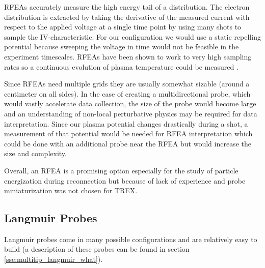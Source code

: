
RFEAs accurately measure the high energy tail of a distribution. The electron distribution is extracted by taking the derivative of the measured current with respect to the applied voltage at a single time point by using many shots to sample the IV-characteristic. For our configuration we would use a static repelling potential because sweeping the voltage in time would not be feasible in the experiment timescales. RFEAs have been shown to work to very high sampling rates so a continuous evolution of plasma temperature could be measured \cite{Hu_Rovey_Zhao_2017}.


Since RFEAs need multiple grids they are usually somewhat sizable (around a centimeter on all sides). In the case of creating a multidirectional probe, which would vastly accelerate data collection, the size of the probe would become large and an understanding of non-local perturbative physics may be required for data interpretation. Since our plasma potential changes drastically during a shot, a measurement of that potential would be needed for RFEA interpretation which could be done with an additional probe near the RFEA but would increase the size and complexity.

Overall, an RFEA is a promising option especially for the study of particle energization during reconnection but because of lack of experience and probe miniaturization was not chosen for TREX.

\subsection{Langmuir Probes}

Langmuir probes come in many possible configurations and are relatively easy to build (a description of these probes can be found in section \ref{sse:multitip_langmuir_what}).


